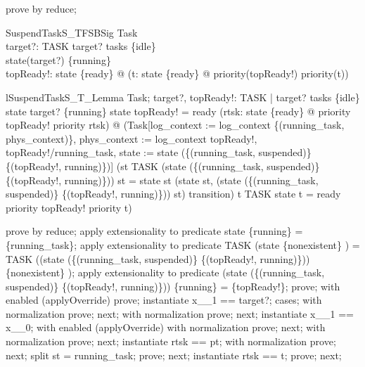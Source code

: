 \documentclass[a4paper, 12pt]{article}
\begin{document}
\begin{zproof}[TaskProperty5]
prove by reduce;
\end{zproof}

\begin{schema}{SuspendTaskS\_TFSBSig}
  Task\\
  target?: TASK
\where
  target? \in  tasks \setminus  \{idle\}\\
  state(target?) \in  \{running\}\\
  \exists topReady!: state \inv \limg \{ready\} \rimg @  (\forall  t: state \inv  \limg  \{ready\} \rimg  @ priority(topReady!) \geq  priority(t))
\end{schema}

\begin{theorem}{lSuspendTaskS\_T\_Lemma}
\forall  Task; target?, topReady!: TASK | target? \in  tasks \setminus  \{idle\} \land  state target? \in  \{running\} \land  state topReady! = ready \land  (\forall  rtsk: state \inv  \limg  \{ready\} \rimg  @ priority topReady! \geq  priority rtsk) @ \lnot  (Task[log\_context := log\_context \oplus  \{(running\_task, phys\_context)\}, phys\_context := log\_context topReady!, topReady!/running\_task, state := state \oplus  (\{(running\_task, suspended)\} \cup  \{(topReady!, running)\})] \land  (st \in  TASK \land  \lnot  (state \oplus  (\{(running\_task, suspended)\} \cup  \{(topReady!, running)\})) st = state st \implies  (state st, (state \oplus  (\{(running\_task, suspended)\} \cup  \{(topReady!, running)\})) st) \in  transition) \implies  t \in  TASK \land  state t = ready \land  \lnot  priority topReady! \geq  priority t)
\end{theorem}

\begin{zproof}
prove by reduce;
apply extensionality to predicate state \inv  \limg  \{running\} \rimg  = \{running\_task\};
apply extensionality to predicate TASK \setminus  (state \inv  \limg  \{nonexistent\} \rimg ) = TASK \setminus  ((state \oplus  (\{(running\_task, suspended)\} \cup  \{(topReady!, running)\})) \inv  \limg  \{nonexistent\} \rimg );
apply extensionality to predicate (state \oplus  (\{(running\_task, suspended)\} \cup  \{(topReady!, running)\})) \inv  \limg  \{running\} \rimg  = \{topReady!\};
prove;
with enabled (applyOverride) prove;
instantiate x\_\_1 == target?;
cases;
with normalization prove;
next;
with normalization prove;
next;
instantiate x\_\_1 == x\_\_0;
with enabled (applyOverride) with normalization prove;
next;
with normalization prove;
next;
instantiate rtsk == pt;
with normalization prove;
next;
split st = running\_task;
prove;
next;
instantiate rtsk == t;
prove;
next;
\end{zproof}
\end{document}
